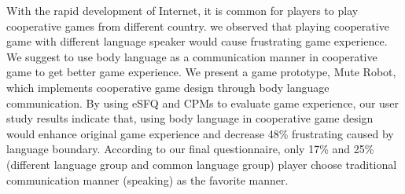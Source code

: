
With the rapid development of Internet, it is common for players to play cooperative games from different country. 
we observed that playing cooperative game with different language speaker would cause frustrating game experience.
We suggest to use body language as a communication manner in cooperative game to get better game experience. 
We present a game prototype, Mute Robot, which implements cooperative game design through body language communication.
By using eSFQ\cite{eSFQ} and CPMs\cite{CPMs} to evaluate game experience, our user study results indicate that, using body language in cooperative game design would enhance original game experience and decrease 48\% frustrating caused by language boundary.
According to our final questionnaire, only 17\% and 25\% (different language group and common language group) player choose traditional communication manner (speaking) as the favorite manner.
